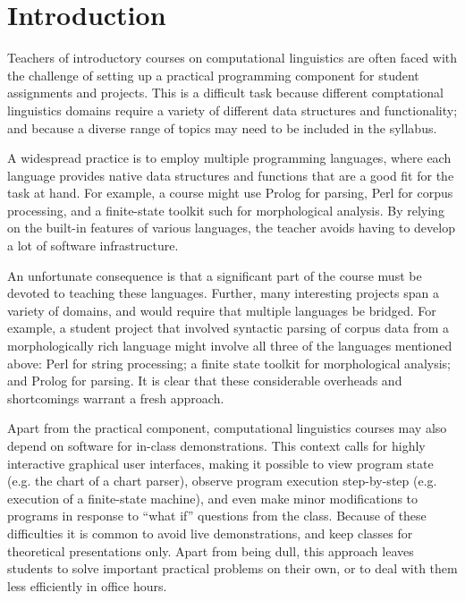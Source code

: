 \documentclass[11pt]{article}
\begin{document}
\section{Introduction}

Teachers of introductory courses on computational linguistics are
often faced with the challenge of setting up a practical programming
component for student assignments and projects.  This is a difficult
task because different comptational linguistics domains require a
variety of different data structures and functionality; and because a
diverse range of topics may need to be included in the syllabus.

A widespread practice is to employ multiple programming languages,
where each language provides native data structures and functions that
are a good fit for the task at hand.  For example, a course might use
Prolog for parsing, Perl for corpus processing, and a finite-state
toolkit such for morphological analysis.  By relying on the built-in
features of various languages, the teacher avoids having to develop a
lot of software infrastructure.

An unfortunate consequence is that a significant part of the course
must be devoted to teaching these languages.  Further, many
interesting projects span a variety of domains, and would require that
multiple languages be bridged.  For example, a student project that
involved syntactic parsing of corpus data from a morphologically rich
language might involve all three of the languages mentioned above:
Perl for string processing; a finite state toolkit for morphological
analysis; and Prolog for parsing.
It is clear that these considerable overheads and shortcomings warrant
a fresh approach.

Apart from the practical component, computational linguistics courses
may also depend on software for in-class demonstrations.  This context
calls for highly interactive graphical user interfaces, making it
possible to view program state (e.g. the chart of a chart parser),
observe program execution step-by-step (e.g. execution of a
finite-state machine), and even make minor modifications to programs
in response to ``what if'' questions from the class.  Because of these
difficulties it is common to avoid live demonstrations, and keep
classes for theoretical presentations only.  Apart from being dull,
this approach leaves students to solve important practical problems on
their own, or to deal with them less efficiently in office hours.
\end{document}
